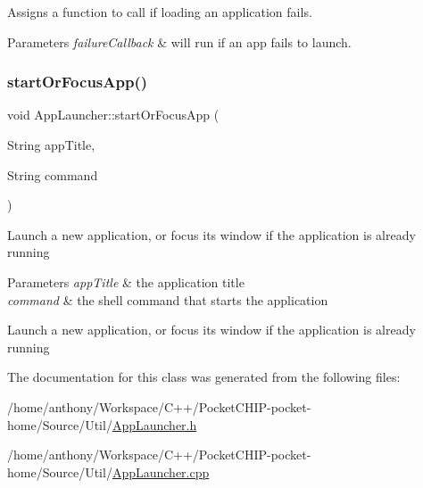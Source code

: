 Assigns a function to call if loading an application fails. 
\begin{DoxyParams}{Parameters}
{\em failure\+Callback} & will run if an app fails to launch. \\
\hline
\end{DoxyParams}
\mbox{\label{classAppLauncher_aed24738d11e9685953c8ad772aeaf846}} 
\subsubsection{\texorpdfstring{start\+Or\+Focus\+App()}{startOrFocusApp()}}
{\footnotesize\ttfamily void App\+Launcher\+::start\+Or\+Focus\+App (\begin{DoxyParamCaption}\item[{String}]{app\+Title,  }\item[{String}]{command }\end{DoxyParamCaption})}

Launch a new application, or focus its window if the application is already running 
\begin{DoxyParams}{Parameters}
{\em app\+Title} & the application title \\
\hline
{\em command} & the shell command that starts the application\\
\hline
\end{DoxyParams}
Launch a new application, or focus its window if the application is already running 

The documentation for this class was generated from the following files\+:\begin{DoxyCompactItemize}
\item 
/home/anthony/\+Workspace/\+C++/\+Pocket\+C\+H\+I\+P-\/pocket-\/home/\+Source/\+Util/\mbox{\hyperlink{AppLauncher_8h}{App\+Launcher.\+h}}\item 
/home/anthony/\+Workspace/\+C++/\+Pocket\+C\+H\+I\+P-\/pocket-\/home/\+Source/\+Util/\mbox{\hyperlink{AppLauncher_8cpp}{App\+Launcher.\+cpp}}\end{DoxyCompactItemize}
